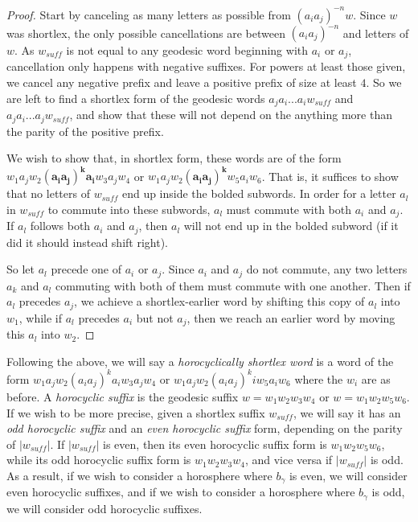 \documentclass[10pt,a4paper]{amsart}
\theoremstyle{definition}
\theoremstyle{remark}
\begin{document}
	\begin{proof}
		Start by canceling as many letters as possible from $(a_ia_j)^{-n}w$. Since $w$ was shortlex, the only possible cancellations are between $(a_ia_j)^{-n}$ and letters of $w$. As $w_{suff}$ is not equal to any geodesic word beginning with $a_i$ or $a_j$, cancellation only happens with negative suffixes. For powers at least those given, we cancel any negative prefix and leave a positive prefix of size at least $4$. So we are left to find a shortlex form of the geodesic words $a_ja_i...a_iw_{suff}$ and $a_ja_i...a_j w_{suff}$, and show that these will not depend on the anything more than the parity of the positive prefix.
		
		We wish to show that, in shortlex form, these words are of the form $w_1a_jw_2\mathbf{(a_ia_j)^ka_i}w_3a_jw_4$ or $w_1a_jw_2\mathbf{(a_ia_j)^k}w_5a_iw_6$. That is, it suffices to show that no letters of $w_{suff}$ end up inside the bolded subwords. In order for a letter $a_l$ in $w_{suff}$ to commute into these subwords, $a_l$ must commute with both $a_i$ and $a_j$. If $a_l$ follows both $a_i$ and $a_j$, then $a_l$ will not end up in the bolded subword (if it did it should instead shift right). 
		
		So let $a_l$ precede one of $a_i$ or $a_j$. Since $a_i$ and $a_j$ do not commute, any two letters $a_k$ and $a_l$ commuting with both of them must commute with one another. Then if $a_l$ precedes $a_j$, we achieve a shortlex-earlier word by shifting this copy of $a_l$ into $w_1$, while if $a_l$ precedes $a_i$ but not $a_j$, then we reach an earlier word by moving this $a_l$ into $w_2$. 		
	\end{proof}
	
	Following the above, we will say a \textit{horocyclically shortlex word} is a word of the form $w_1a_jw_2(a_ia_j)^ka_iw_3a_jw_4$ or $w_1a_jw_2(a_ia_j)^kiw_5a_iw_6$ where the $w_i$ are as before.  A \textit{horocyclic suffix} is the geodesic suffix $w=w_1w_2w_3w_4$ or $w=w_1w_2w_5w_6$. If we wish to be more precise, given a shortlex suffix $w_{suff}$, we will say it has an \textit{odd horocyclic suffix} and an \textit{even horocyclic suffix} form, depending on the parity of $|w_{suff}|$. If $|w_{suff}|$ is even, then its even horocyclic suffix form is $w_1w_2w_5w_6$, while its odd horocyclic suffix form is $w_1w_2w_3w_4$, and vice versa if $|w_{suff}|$ is odd. As a result, if we wish to consider a horosphere where $b_{\gamma}$ is even, we will consider even horocyclic suffixes, and if we wish to consider a horosphere where $b_{\gamma}$ is odd, we will consider odd horocyclic suffixes.
	
\end{document}
